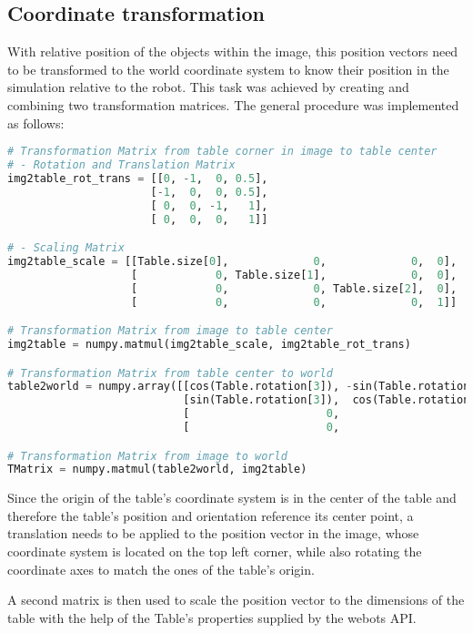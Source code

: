 \subsection{Coordinate transformation}

With relative position of the objects within the image, this position vectors need to be transformed to the world coordinate system to know their position in the simulation relative to the robot. 
This task was achieved by creating and combining two transformation matrices. The general procedure was implemented as follows:


\begin{lstlisting}[language=python]
# Transformation Matrix from table corner in image to table center
# - Rotation and Translation Matrix
img2table_rot_trans = [[0, -1,  0, 0.5],
                      [-1,  0,  0, 0.5],
                      [ 0,  0, -1,   1],
                      [ 0,  0,  0,   1]]

# - Scaling Matrix
img2table_scale = [[Table.size[0],             0,             0,  0],
                   [            0, Table.size[1],             0,  0],
                   [            0,             0, Table.size[2],  0],
                   [            0,             0,             0,  1]]

# Transformation Matrix from image to table center
img2table = numpy.matmul(img2table_scale, img2table_rot_trans)

# Transformation Matrix from table center to world
table2world = numpy.array([[cos(Table.rotation[3]), -sin(Table.rotation[3]),  0,  Table.position[0]],
                           [sin(Table.rotation[3]),  cos(Table.rotation[3]),  0,  Table.position[1]],
                           [                     0,                       0,  1,  Table.position[2]],
                           [                     0,                       0,  0,                 1]])

# Transformation Matrix from image to world
TMatrix = numpy.matmul(table2world, img2table)
\end{lstlisting}

Since the origin of the table's coordinate system is in the center of the table and therefore the table's position and orientation reference its center point, a translation needs to be applied to the position vector in the image, whose coordinate system is located on the top left corner, while also rotating the coordinate axes to match the ones of the table's origin.

A second matrix is then used to scale the position vector to the dimensions of the table with the help of the Table's properties supplied by the webots API.


